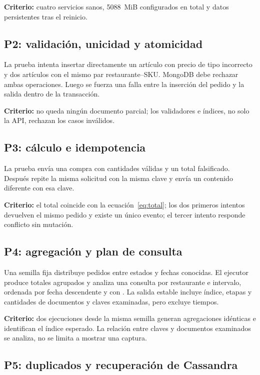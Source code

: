 \textbf{Criterio:} cuatro servicios sanos, 5088~MiB configurados en total y datos persistentes tras el reinicio.

\subsection{P2: validación, unicidad y atomicidad}

La prueba intenta insertar directamente un artículo con precio de tipo incorrecto y dos artículos con el mismo par restaurante--SKU. MongoDB debe rechazar ambas operaciones. Luego se fuerza una falla entre la inserción del pedido y la salida dentro de la transacción.

\textbf{Criterio:} no queda ningún documento parcial; los validadores e índices, no solo la API, rechazan los casos inválidos.

\subsection{P3: cálculo e idempotencia}

La prueba envía una compra con cantidades válidas y un total falsificado. Después repite la misma solicitud con la misma clave y envía un contenido diferente con esa clave.

\textbf{Criterio:} el total coincide con la ecuación~\ref{eq:total}; los dos primeros intentos devuelven el mismo pedido y existe un único evento; el tercer intento responde conflicto sin mutación.

\subsection{P4: agregación y plan de consulta}

Una semilla fija distribuye pedidos entre estados y fechas conocidas. El ejecutor produce totales agrupados y analiza una consulta por restaurante e intervalo, ordenada por fecha descendente y con . La salida estable incluye índice, etapas y cantidades de documentos y claves examinadas, pero excluye tiempos.

\textbf{Criterio:} dos ejecuciones desde la misma semilla generan agregaciones idénticas e identifican el índice esperado. La relación entre claves y documentos examinados se analiza, no se limita a mostrar una captura.

\subsection{P5: duplicados y recuperación de Cassandra}

